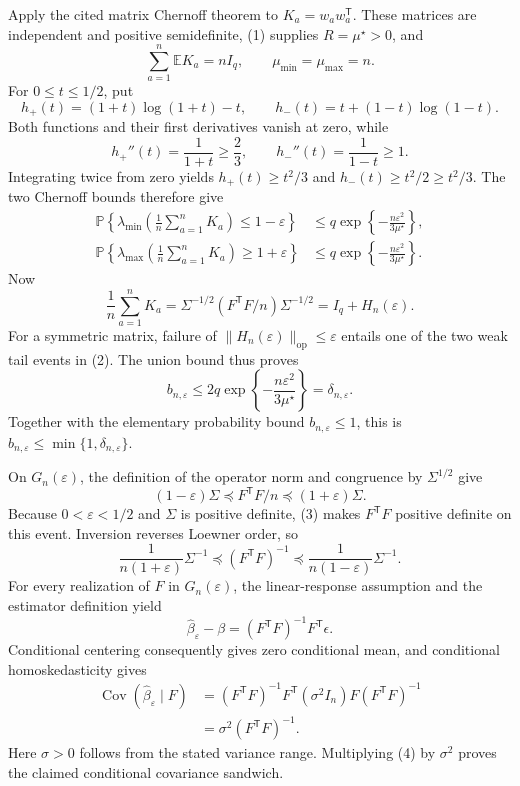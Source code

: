 Apply the cited matrix Chernoff theorem to \(K_a=w_aw_a^{\mathsf T}\).  These matrices are independent and positive semidefinite, (1) supplies \(R=\mu^\star>0\), and
\[
 \sum_{a=1}^n\mathbb E K_a=nI_q,
 \qquad \mu_{\min}=\mu_{\max}=n.
\]
For \(0\le t\le1/2\), put
\[
 h_+(t)=(1+t)\log(1+t)-t,
 \qquad
 h_-(t)=t+(1-t)\log(1-t).
\]
Both functions and their first derivatives vanish at zero, while
\[
 h_+''(t)=\frac{1}{1+t}\ge\frac23,
 \qquad
 h_-''(t)=\frac{1}{1-t}\ge1.
\]
Integrating twice from zero yields \(h_+(t)\ge t^2/3\) and \(h_-(t)\ge t^2/2\ge t^2/3\).  The two Chernoff bounds therefore give
\[
\begin{aligned}
 \mathbb P\!\left\{\lambda_{\min}\!\left(\frac1n\sum_{a=1}^nK_a\right)
 \le1-\varepsilon\right\}
 &\le q\exp\!\left\{-\frac{n\varepsilon^2}{3\mu^\star}\right\},\\
 \mathbb P\!\left\{\lambda_{\max}\!\left(\frac1n\sum_{a=1}^nK_a\right)
 \ge1+\varepsilon\right\}
 &\le q\exp\!\left\{-\frac{n\varepsilon^2}{3\mu^\star}\right\}.
\end{aligned} \tag{2}
\]
Now
\[
 \frac1n\sum_{a=1}^nK_a
 =\Sigma^{-1/2}(F^{\mathsf T}F/n)\Sigma^{-1/2}
 =I_q+H_n(\varepsilon).
\]
For a symmetric matrix, failure of \(\|H_n(\varepsilon)\|_{\mathrm{op}}\le\varepsilon\) entails one of the two weak tail events in (2).  The union bound thus proves
\[
 b_{n,\varepsilon}
 \le2q\exp\!\left\{-\frac{n\varepsilon^2}{3\mu^\star}\right\}
 =\delta_{n,\varepsilon}.
\]
Together with the elementary probability bound \(b_{n,\varepsilon}\le1\), this is
\(b_{n,\varepsilon}\le\min\{1,\delta_{n,\varepsilon}\}\).

On \(G_n(\varepsilon)\), the definition of the operator norm and congruence by \(\Sigma^{1/2}\) give
\[
 (1-\varepsilon)\Sigma
 \preceq F^{\mathsf T}F/n
 \preceq(1+\varepsilon)\Sigma. \tag{3}
\]
Because \(0<\varepsilon<1/2\) and \(\Sigma\) is positive definite, (3) makes \(F^{\mathsf T}F\) positive definite on this event.  Inversion reverses Loewner order, so
\[
 \frac{1}{n(1+\varepsilon)}\Sigma^{-1}
 \preceq(F^{\mathsf T}F)^{-1}
 \preceq\frac{1}{n(1-\varepsilon)}\Sigma^{-1}. \tag{4}
\]
For every realization of \(F\) in \(G_n(\varepsilon)\), the linear-response assumption and the estimator definition yield
\[
 \widehat\beta_\varepsilon-\beta
 =(F^{\mathsf T}F)^{-1}F^{\mathsf T}\epsilon.
\]
Conditional centering consequently gives zero conditional mean, and conditional homoskedasticity gives
\[
\begin{aligned}
 \operatorname{Cov}(\widehat\beta_\varepsilon\mid F)
 &=(F^{\mathsf T}F)^{-1}F^{\mathsf T}
   (\sigma^2I_n)F(F^{\mathsf T}F)^{-1}\\
 &=\sigma^2(F^{\mathsf T}F)^{-1}.
\end{aligned} \tag{5}
\]
Here \(\sigma>0\) follows from the stated variance range.  Multiplying (4) by \(\sigma^2\) proves the claimed conditional covariance sandwich.

